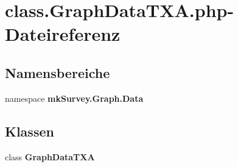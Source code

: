 \section{class.GraphDataTXA.php-Dateireferenz}
\label{class_8GraphDataTXA_8php}
\subsection*{Namensbereiche}
\begin{CompactItemize}
\item 
namespace {\bf mkSurvey.Graph.Data}
\end{CompactItemize}
\subsection*{Klassen}
\begin{CompactItemize}
\item 
class {\bf GraphDataTXA}
\end{CompactItemize}

